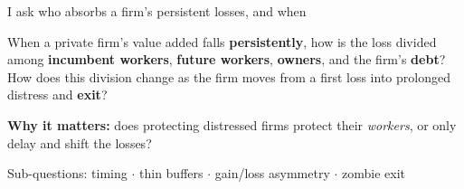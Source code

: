 \documentclass[aspectratio=169,11pt]{beamer}
\newlength{\safezone}
\newcommand{\hl}[1]{{\color{WarmAmber}\bfseries #1}}
\newcommand{\muted}[1]{{\color{CoolGray}#1}}
\begin{document}
\begin{frame}[label=question]{I ask who absorbs a firm's persistent losses, and when}
  \vspace{2pt}
  \begin{keybox}
    \large When a private firm's value added falls \hl{persistently}, how is the loss divided among
    \textbf{incumbent workers}, \textbf{future workers}, \textbf{owners}, and the firm's \textbf{debt}?
    How does this division change as the firm moves from a first loss into \alert{prolonged distress} and \textbf{exit}?
  \end{keybox}
  \vspace{6pt}
  \begin{accentbox}
    \textbf{Why it matters:} does protecting distressed firms protect their \emph{workers}, or only delay and shift the losses?
  \end{accentbox}
  \vfill
  {\small\muted{Sub-questions: timing $\cdot$ thin buffers $\cdot$ gain/loss asymmetry $\cdot$ zombie exit}}%
  \hfill\hyperlink{subq}{}\,\hyperlink{whocares}{}\hspace{\safezone}
\end{frame}
\end{document}
